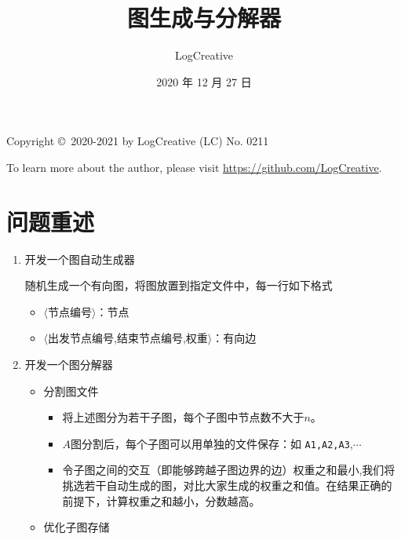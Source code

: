 \documentclass[a4paper,12pt]{article}
\begin{document}
\begin{CJK}{UTF8}{song}
\title{图生成与分解器}
\author{LogCreative}
\date{2020 年 12 月 27 日}
\maketitle
\normalsize

\tableofcontents

\begin{tcolorbox}
  Copyright \copyright\ 2020-2021 by LogCreative  (LC) No. 0211
  
  To learn more about the author, please visit \href{https://github.com/LogCreative}{https://github.com/LogCreative}.
\end{tcolorbox}

\section{问题重述}

\begin{enumerate}
    \item 开发一个图自动生成器
    
    随机生成一个有向图，将图放置到指定文件中，每一行如下格式
    \begin{itemize}
        \item $\langle$节点编号$\rangle$：节点
        \item $\langle$出发节点编号,结束节点编号,权重$\rangle$：有向边
    \end{itemize}

    \item 开发一个图分解器
    \begin{itemize}
        \item 分割图文件
        \begin{itemize}
            \item 将上述图分为若干子图，每个子图中节点数不大于$n$。
            \item $A$图分割后，每个子图可以用单独的文件保存：如 \texttt{A1,A2,A3},$\cdots$
            \item 令子图之间的交互（即能够跨越子图边界的边）权重之和最小,我们将挑选若干自动生成的图，对比大家生成的权重之和值。在结果正确的前提下，计算权重之和越小，分数越高。
        \end{itemize}
        \item 优化子图存储
        

\end{itemize}
\end{enumerate}
\end{CJK}
\end{document}
